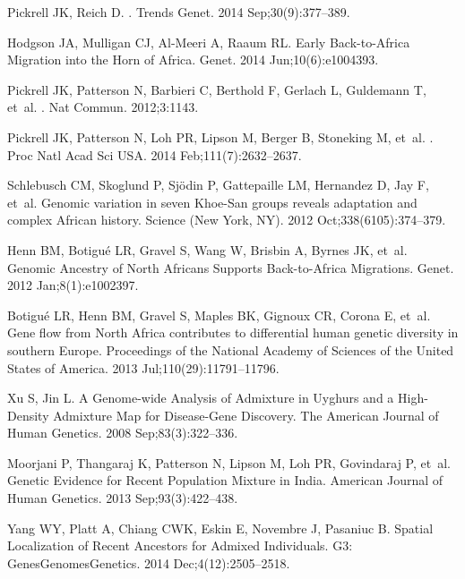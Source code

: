 \documentclass[10pt,letterpaper]{article}
\begin{document}
\begin{thebibliography}{80}
Pickrell JK, Reich D.
.
\newblock Trends Genet. 2014 Sep;30(9):377--389.

Hodgson JA, Mulligan CJ, Al-Meeri A, Raaum RL.
\newblock Early Back-to-{Africa} Migration into the {Horn} of {Africa}.
 Genet. 2014 Jun;10(6):e1004393.

Pickrell JK, Patterson N, Barbieri C, Berthold F, Gerlach L, Guldemann T,
  et~al.
.
\newblock Nat Commun. 2012;3:1143.

Pickrell JK, Patterson N, Loh PR, Lipson M, Berger B, Stoneking M, et~al.
.
\newblock Proc Natl Acad Sci USA. 2014 Feb;111(7):2632--2637.

Schlebusch CM, Skoglund P, Sjödin P, Gattepaille LM, Hernandez D, Jay F,
  et~al.
\newblock Genomic variation in seven {Khoe}-{San} groups reveals adaptation and
  complex {African} history.
\newblock Science (New York, NY). 2012 Oct;338(6105):374--379.

Henn BM, Botigué LR, Gravel S, Wang W, Brisbin A, Byrnes JK, et~al.
\newblock Genomic Ancestry of {North} {Africans} Supports Back-to-{Africa}
  Migrations.
 Genet. 2012 Jan;8(1):e1002397.

Botigué LR, Henn BM, Gravel S, Maples BK, Gignoux CR, Corona E, et~al.
\newblock Gene flow from {North} {Africa} contributes to differential human
  genetic diversity in southern {Europe}.
\newblock Proceedings of the National Academy of Sciences of the United States
  of America. 2013 Jul;110(29):11791--11796.

Xu S, Jin L.
\newblock A Genome-wide Analysis of Admixture in {Uyghurs} and a High-Density
  Admixture Map for Disease-Gene Discovery.
\newblock The American Journal of Human Genetics. 2008 Sep;83(3):322--336.

Moorjani P, Thangaraj K, Patterson N, Lipson M, Loh PR, Govindaraj P, et~al.
\newblock Genetic Evidence for Recent Population Mixture in {India}.
\newblock American Journal of Human Genetics. 2013 Sep;93(3):422--438.

Yang WY, Platt A, Chiang CWK, Eskin E, Novembre J, Pasaniuc B.
\newblock Spatial Localization of Recent Ancestors for Admixed Individuals.
\newblock G3: Genes{\textbar}Genomes{\textbar}Genetics. 2014
  Dec;4(12):2505--2518.


\end{thebibliography}
\end{document}
